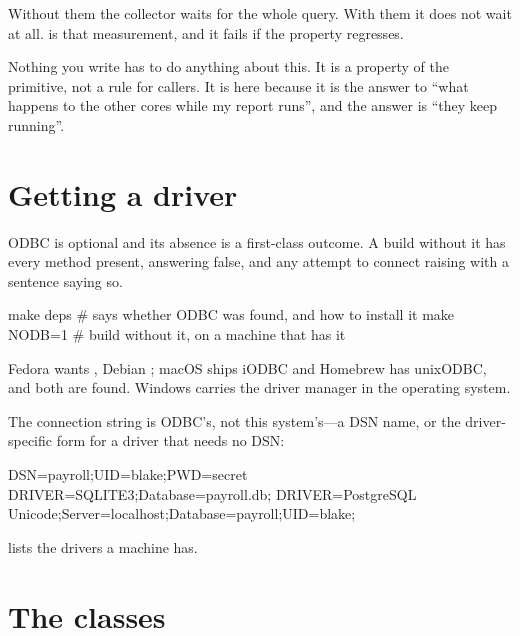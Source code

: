 Without them the collector waits for the whole query. With them it does not
wait at all.  is that measurement, and
it fails if the property regresses.

\begin{stnote}
Nothing you write has to do anything about this. It is a property of the
primitive, not a rule for callers. It is here because it is the answer to
``what happens to the other cores while my report runs'', and the answer is
``they keep running''.
\end{stnote}

\section{Getting a driver}

ODBC is optional and its absence is a first-class outcome. A build without it
has every method present,  answering false, and any
attempt to connect raising with a sentence saying so.

\begin{sh}
make deps                # says whether ODBC was found, and how to install it
make NODB=1              # build without it, on a machine that has it
\end{sh}

Fedora wants , Debian ; macOS ships iODBC
and Homebrew has unixODBC, and both are found. Windows carries the driver
manager in the operating system.

The connection string is ODBC's, not this system's---a DSN name, or the
driver-specific form for a driver that needs no DSN:

\begin{plain}
DSN=payroll;UID=blake;PWD=secret
DRIVER=SQLITE3;Database=payroll.db;
DRIVER={PostgreSQL Unicode};Server=localhost;Database=payroll;UID=blake;
\end{plain}

 lists the drivers a machine has.

\section{The classes}

